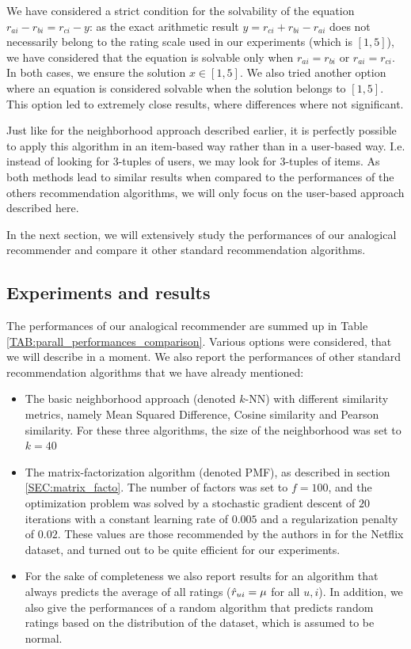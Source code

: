 We have considered a strict condition for the solvability of the equation
$r_{ai} - r_{bi} = r_{ci} - y$: as the exact arithmetic result $y=r_{ci} +
r_{bi} -r_{ai}$ does not necessarily belong to the rating scale used in our
experiments (which is $[1,5]$), we have
considered that the equation is solvable only when $r_{ai}=r_{bi}$ or
$r_{ai}=r_{ci}$. In both cases, we ensure the solution $x \in
[1,5]$. We also tried another option where an equation is considered solvable
when the solution belongs to $[1, 5]$. This option led to extremely close
results, where differences where not significant.

Just like for the neighborhood approach described earlier, it is perfectly
possible to apply this algorithm in an item-based way rather
than in a user-based way. I.e. instead of looking for $3$-tuples of users, we
may look for $3$-tuples of items.  As both methods lead to similar results when
compared to
the performances of the others recommendation algorithms, we
will only focus on the user-based approach described here.

In the next section, we will extensively study the performances of our
analogical recommender and compare it other standard recommendation algorithms.

\subsection{Experiments and results}
\label{SEC:experiments_analogical_reco_basic}

The performances of our analogical recommender are summed up in Table
\ref{TAB:parall_performances_comparison}. Various options were considered, that
we will describe in a moment. We also report the performances of other standard
recommendation algorithms that we have already mentioned:
\begin{itemize}
  \item The basic neighborhood approach (denoted $k$-NN) with different
    similarity metrics, namely Mean Squared Difference, Cosine similarity and
    Pearson similarity.  For these three algorithms, the size of the
    neighborhood was set to $k=40$
  \item The matrix-factorization algorithm (denoted PMF), as described in section \ref{SEC:matrix_facto}.
    The number of factors was set to $f = 100$, and the optimization problem
    was solved by a stochastic gradient descent of $20$ iterations with
    a constant learning rate of $0.005$ and a regularization penalty of $0.02$.
    These values are those recommended by the authors in \cite{KorBel11} for the
    Netflix dataset, and turned out to be quite efficient for our experiments.
  \item For the sake of completeness we also report results for an algorithm
    that always predicts the average of all ratings ($\hat{r}_{ui} = \mu$ for all
    $u, i$). In addition, we also give the performances of a random algorithm
    that predicts random ratings based on the distribution of the dataset,
    which is assumed to be normal.
\end{itemize}

